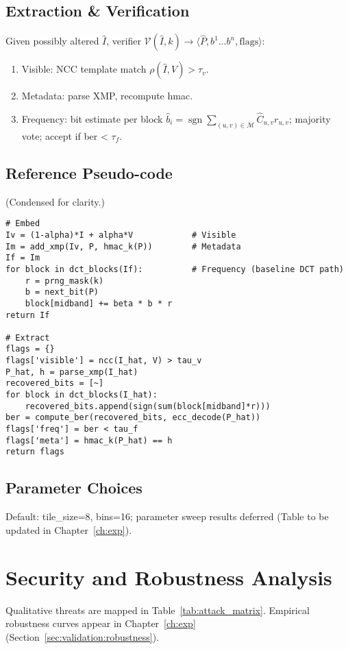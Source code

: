 \subsection{Extraction \& Verification}\label{subsec:extraction-&-verification}
Given possibly altered $\hat I$, verifier $\mathcal V(\hat I,k) \to \langle \hat P, b^1\dots b^n, \text{flags}\rangle$:
\begin{enumerate}
  \item Visible: NCC template match $\rho(\hat I, V) > \tau_v$.
  \item Metadata: parse XMP, recompute \gls{hmac}.
  \item Frequency: bit estimate per block $\hat b_i = \operatorname{sgn}\sum_{(u,v)\in\mathcal M} \hat C_{u,v} r_{u,v}$; majority vote; accept if \gls{ber} < $\tau_f$.
\end{enumerate}

\subsection{Reference Pseudo-code}
(Condensed for clarity.)\label{subsec:reference-pseudo-code}
\begin{verbatim}
# Embed
Iv = (1-alpha)*I + alpha*V            # Visible
Im = add_xmp(Iv, P, hmac_k(P))        # Metadata
If = Im
for block in dct_blocks(If):          # Frequency (baseline DCT path)
    r = prng_mask(k)
    b = next_bit(P)
    block[midband] += beta * b * r
return If

# Extract
flags = {}
flags['visible'] = ncc(I_hat, V) > tau_v
P_hat, h = parse_xmp(I_hat)
recovered_bits = [~]
for block in dct_blocks(I_hat):
    recovered_bits.append(sign(sum(block[midband]*r)))
ber = compute_ber(recovered_bits, ecc_decode(P_hat))
flags['freq'] = ber < tau_f
flags['meta'] = hmac_k(P_hat) == h
return flags
\end{verbatim}

\subsection{Parameter Choices}\label{subsec:parameter-choices}
Default: tile\_size=8, bins=16; parameter sweep results deferred (Table to be updated in Chapter~\ref{ch:exp}).

\section{Security and Robustness Analysis}
\label{sec:deep_dive:analysis}
Qualitative threats are mapped in Table~\ref{tab:attack_matrix}.
Empirical robustness curves appear in Chapter~\ref{ch:exp} (Section~\ref{sec:validation:robustness}).

